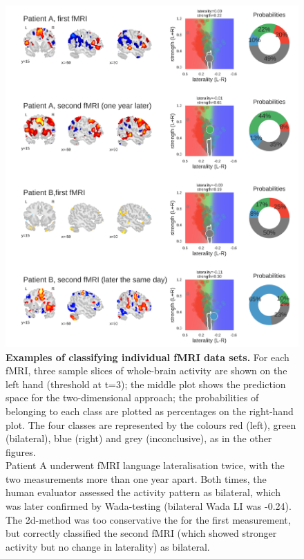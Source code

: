 \documentclass[fleqn,10pt]{SelfArx} %
\begin{document}
\begin{figure}[htbp]
	\begin{minipage}{\textwidth}
		\renewcommand{\familydefault}{\sfdefault}\normalfont
		\centering
		\includegraphics[width=0.9\columnwidth]{../reports/figures/12-single-case-examples.png}
		\caption{\textbf{Examples of classifying individual fMRI data sets.} 
			For each fMRI, three sample slices of whole-brain activity are shown on the left hand (threshold at t=3); the middle plot shows the prediction space for the two-dimensional approach; the probabilities of belonging to each class are plotted as percentages on the right-hand plot. The four classes are represented by the colours red (left), green (bilateral), blue (right) and grey (inconclusive), as in the other figures.\\
			Patient A underwent fMRI language lateralisation twice, with the two measurements more than one year apart. Both times, the human evaluator assessed the activity pattern as bilateral, which was later confirmed by Wada-testing (bilateral Wada LI was -0.24). The 2d-method was too conservative the for the first measurement, but correctly classified the second fMRI (which showed stronger activity but no change in laterality) as bilateral.\\
}
\end{minipage}
\end{figure}
\end{document}
